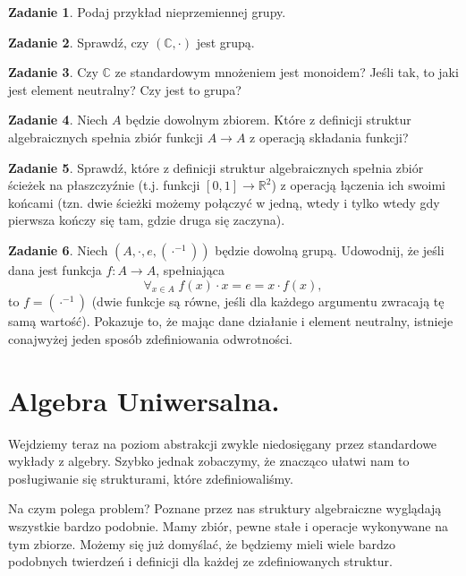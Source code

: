 \documentclass{article}
\theoremstyle{definition}
\newtheorem{exercise}{Zadanie}[section]
\begin{document}
\begin{exercise}
	Podaj przykład nieprzemiennej grupy.
\end{exercise}

\begin{exercise}
	Sprawdź, czy $(\mathbb{C}, \cdot)$ jest grupą.
\end{exercise}

\begin{exercise}
	Czy $\mathbb{C}$ ze standardowym mnożeniem jest monoidem? Jeśli tak, to jaki jest element neutralny? Czy jest to grupa?
\end{exercise}

\begin{exercise}
	Niech $A$ będzie dowolnym zbiorem.
	Które z definicji struktur algebraicznych spełnia zbiór funkcji $A \to A$ z operacją składania funkcji?
\end{exercise}

\begin{exercise}
	Sprawdź, które z definicji struktur algebraicznych spełnia zbiór ścieżek na płaszczyźnie (t.j. funkcji $[0, 1] \to \mathbb{R}^2$) z operacją łączenia ich swoimi końcami (tzn. dwie ścieżki możemy połączyć w jedną, wtedy i tylko wtedy gdy pierwsza kończy się tam, gdzie druga się zaczyna).
\end{exercise}

\begin{exercise}
    Niech $(A, \cdot, e, (\cdot^{-1}))$ będzie dowolną grupą.
    Udowodnij, że jeśli dana jest funkcja $f: A \to A$, spełniająca
    \begin{equation*}
        \forall_{x\in A}\; f(x) \cdot x = e = x \cdot f(x),
    \end{equation*}
    to $f = (\cdot^{-1})$ (dwie funkcje są równe, jeśli dla każdego argumentu zwracają tę samą wartość).
    Pokazuje to, że mając dane działanie i element neutralny,
        istnieje conajwyżej jeden sposób zdefiniowania odwrotności.
\end{exercise}

\section{Algebra Uniwersalna.}
Wejdziemy teraz na poziom abstrakcji zwykle niedosięgany przez standardowe wykłady z algebry.
Szybko jednak zobaczymy,
że znacząco ułatwi nam to posługiwanie się strukturami,
które zdefiniowaliśmy.

Na czym polega problem?
Poznane przez nas struktury algebraiczne wyglądają wszystkie bardzo podobnie.
Mamy zbiór, pewne stałe i operacje wykonywane na tym zbiorze.
Możemy się już domyślać,
że będziemy mieli wiele bardzo podobnych twierdzeń i definicji dla każdej ze zdefiniowanych struktur.
\end{document}
